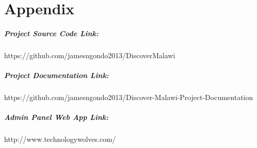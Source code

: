 \chapter{Appendix}
\paragraph{Project Source Code Link:}
https://github.com/jamesngondo2013/DiscoverMalawi

\paragraph{Project Documentation Link:}
 https://github.com/jamesngondo2013/Discover-Malawi-Project-Documentation
 
 \paragraph{Admin Panel Web App Link:}
 http://www.technologywolves.com/
